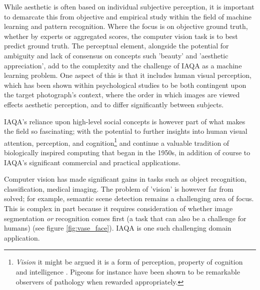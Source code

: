 While aesthetic is often based on individual subjective perception, it is important to demarcate this from objective and empirical study within the field of machine learning and pattern recognition. Where the focus is on objective ground truth, whether by experts or aggregated scores, the computer vision task is to best predict ground truth. The perceptual element, alongside the potential for ambiguity and lack of consensus on concepts such 'beauty' and 'aesthetic appreciation'\cite{Datta2006}, add to the complexity and the challenge of IAQA\cite{Yang2019} as a machine learning problem. One aspect of this is that it includes human visual perception, which has been shown within psychological studies to be both contingent upon the target photograph's context\cite{Mullennix2020}, where the order in which images are viewed effects aesthetic perception, and to differ significantly between subjects\cite{Younes2016}. 

\newpage

IAQA's reliance upon high-level social concepts\cite{Datta2006} is however part of what makes the field so fascinating; with the potential to further insights into human visual attention, perception, and cognition\footnote{\textit{Vision} it might be argued it is a form of perception, property of cognition and intelligence\cite{russell2016artificial} . Pigeons for instance have been shown to be remarkable observers of pathology \cite{Levenson2015} when rewarded appropriately.
} and continue a valuable tradition of biologically inspired computing\cite{Hassabis2017} that began in the 1950s, in addition of course to IAQA's significant commercial and practical applications. 

\par 
Computer vision has made significant gains in tasks such as object recognition, classification, medical imaging\cite{Esteva2021}.  The problem of 'vision' is however far from solved; for example, semantic scene detection remains a challenging area of focus. This is complex in part because it requires consideration of whether image segmentation \textit{or} recognition comes first\cite{Kreiman2021} (a task that can also be a challenge for humans) (see figure \ref{fig:vase_face}). IAQA is one such challenging domain application.\par



